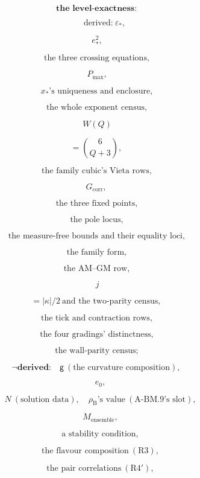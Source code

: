 \documentclass[11pt,openany]{report}
\theoremstyle{canonplain}
\theoremstyle{canondef}
\begin{document}
\[
\textbf{the level-exactness:}
\]

\[
\qquad \text{derived:}\ \varepsilon_\ast,
\]

\[
\ e_\ast^2,
\]

\[
\ \text{the three crossing equations},
\]

\[
\ P_{\max},
\]

\[
\ x_\ast\text{'s uniqueness and enclosure},
\]

\[
\ \text{the whole exponent census},
\]

\[
\ W(Q)
\]

\[
= \binom6{Q+3},
\]

\[
\ \text{the family cubic's Vieta rows},
\]

\[
G_{\mathrm{corr}},
\]

\[
\ \text{the three fixed points},
\]

\[
\ \text{the pole locus},
\]

\[
\ \text{the measure-free bounds and their equality loci},
\]

\[
\ \text{the family form},
\]

\[
\ \text{the AM--GM row},
\]

\[
\ j
\]

\[
= |\kappa|/2\ \text{and the two-parity census},
\]

\[
\ \text{the tick and contraction rows},
\]

\[
\ \text{the four gradings' distinctness},
\]

\[
\ \text{the wall-parity census};
\]

\[
\neg\textbf{derived:}\quad\mathsf g\ (\text{the curvature composition}),
\]

\[
\quad e_0,
\]

\[
\quad N\ (\text{solution data}),\quad\rho_{\mathrm B}\text{'s value}\ (\text{A-BM.9's slot}),
\]

\[
\quad M_{\mathrm{ensemble}},
\]

\[
\quad\text{a stability condition},
\]

\[
\quad\text{the flavour composition}\ (\mathrm{R3}),
\]

\[
\quad\text{the pair correlations}\ (\mathrm{R4}'),
\]
\end{document}
